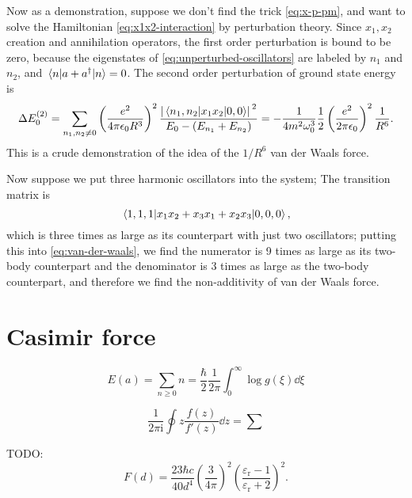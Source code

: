 \documentclass[hyperref, a4paper]{article}
\newcommand*{\ii}{\mathrm{i}}
\begin{document}
Now as a demonstration, suppose we don't find the trick \eqref{eq:x-p-pm}, 
and want to solve the Hamiltonian \eqref{eq:x1x2-interaction}
by perturbation theory.
Since $x_1, x_2$ creation and annihilation operators,
the first order perturbation is bound to be zero, 
because the eigenstates of \eqref{eq:unperturbed-oscillators}
are labeled by $n_1$ and $n_2$, 
and $\mel{n}{a+a^\dagger}{n} = 0$.
The second order perturbation of ground state energy is 
\begin{equation}
    \Delta E_0^{(2)} = \sum_{n_1, n_2 \neq 0} 
    \left(\frac{e^2}{4 \pi \epsilon_0 R^3}\right)^2 \frac{
        \abs*{\mel{n_1, n_2}{x_1 x_2}{0, 0}}^2
    }{
        E_0 - (E_{n_1} + E_{n_2})
    } = - \frac{1}{4 m^2 \omega_0^3} \frac{1}{2} \left(\frac{e^2}{2 \pi \epsilon_0}\right)^2 \frac{1}{R^6}.
    \label{eq:van-der-waals}
\end{equation}
This is a crude demonstration of the idea of 
the $1/R^6$ van der Waals force.

Now suppose we put three harmonic oscillators into the system;
The transition matrix is 
\begin{equation}
    \mel{1, 1, 1}{x_1 x_2 + x_3 x_1 + x_2 x_3}{0, 0, 0},
\end{equation}
which is three times as large as its counterpart 
with just two oscillators;
putting this into \eqref{eq:van-der-waals},
we find the numerator is 9 times as large as 
its two-body counterpart 
and the denominator is 3 times as large as the 
two-body counterpart,
and therefore we find the non-additivity of van der Waals force.

\section{Casimir force}

\begin{equation}
    E(a) = \sum_{n \geq 0} n = \frac{\hbar}{2} \frac{1}{2\pi} \int_{0}^{\infty} \log g(\xi) \dd{\xi}
\end{equation}

\begin{equation}
    \frac{1}{2\pi \ii} \oint z \frac{f(z)}{f'(z)} \dd{z} = \sum
\end{equation}

TODO: 
\begin{equation}
    F(d) = \frac{23 \hbar c}{40 d^4} \left(\frac{3}{4\pi}\right)^2
    \left(\frac{\varepsilon_{\text{r}} - 1}{\varepsilon_{\text{r}} + 2}\right)^2.
\end{equation}
\end{document}
